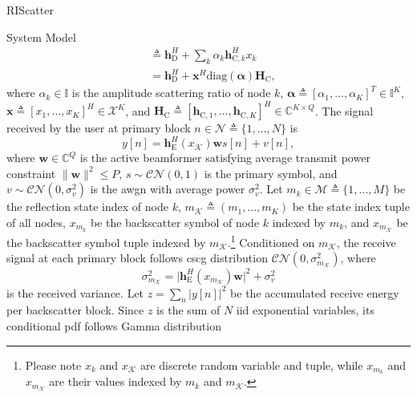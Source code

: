 \documentclass[journal]{IEEEtran}
\begin{document}
\begin{section}{RIScatter}
\begin{subsection}{System Model}
\begin{subequations}
\begin{align}
				 & \triangleq \boldsymbol{h}_{\mathrm{D}}^H + \sum_{k} \alpha_k \boldsymbol{h}_{\mathrm{C},k}^H x_k \label{eq:equivalent_channel_bc}                    \\
				 & = \boldsymbol{h}_{\mathrm{D}}^H + \boldsymbol{x}^H \mathrm{diag}(\boldsymbol{\alpha}) \boldsymbol{H}_{\mathrm{C}}, \label{eq:equivalent_channel_ris}
			\end{align}
		\end{subequations}
		where $\alpha_k \in \mathbb{I}$ is the amplitude scattering ratio of node $k$, $\boldsymbol{\alpha} \triangleq [\alpha_1,\ldots,\alpha_K]^T \in \mathbb{I}^{K}$, $\boldsymbol{x} \triangleq [x_1,\ldots,x_K]^H \in \mathcal{X}^{K}$, and $\boldsymbol{H}_{\mathrm{C}} \triangleq [\boldsymbol{h}_{\mathrm{C},1},\ldots,\boldsymbol{h}_{\mathrm{C},K}]^H \in \mathbb{C}^{K \times Q}$.
		The signal received by the user at primary block $n \in \mathcal{N} \triangleq \{1,\ldots,N\}$ is
		\begin{equation}
			y[n] = \boldsymbol{h}_{\mathrm{E}}^H(x_{\mathcal{K}}) \boldsymbol{w} s[n] + v[n],
			\label{eq:receive_signal}
		\end{equation}
		where $\boldsymbol{w} \in \mathbb{C}^{Q}$ is the active beamformer satisfying average transmit power constraint $\lVert \boldsymbol{w} \rVert^2 \le P$, $s \sim \mathcal{CN}(0,1)$ is the primary symbol, and $v \sim \mathcal{CN}(0,\sigma_v^2)$ is the \gls{awgn} with average power $\sigma_v^2$.
		Let $m_k \in \mathcal{M} \triangleq \{1,\ldots,M\}$ be the reflection state index of node $k$, $m_{\mathcal{K}} \triangleq (m_1,\ldots,m_K)$ be the state index tuple of all nodes, $x_{m_k}$ be the backscatter symbol of node $k$ indexed by $m_k$, and $x_{m_\mathcal{K}}$ be the backscatter symbol tuple indexed by $m_{\mathcal{K}}$.\footnote{Please note $x_k$ and $x_{\mathcal{K}}$ are discrete random variable and tuple, while $x_{m_k}$ and $x_{m_{\mathcal{K}}}$ are their values indexed by $m_k$ and $m_{\mathcal{K}}$.}
		Conditioned on $m_{\mathcal{K}}$, the receive signal at each primary block follows \gls{cscg} distribution $\mathcal{CN}(0,\sigma_{m_{\mathcal{K}}}^2)$, where
		\begin{equation}
			\sigma_{m_{\mathcal{K}}}^2 = \lvert \boldsymbol{h}_{\mathrm{E}}^H(x_{m_{\mathcal{K}}}) \boldsymbol{w} \rvert^2 + \sigma_v^2
			\label{eq:receive_variance}
		\end{equation}
		is the received variance.
		Let $z=\sum_{n} \bigl\lvert y[n] \bigr\rvert^2$ be the accumulated receive energy per backscatter block.
		Since $z$ is the sum of $N$ \gls{iid} exponential variables, its conditional \gls{pdf} follows Gamma distribution

\end{subsection}
\end{section}
\end{document}
